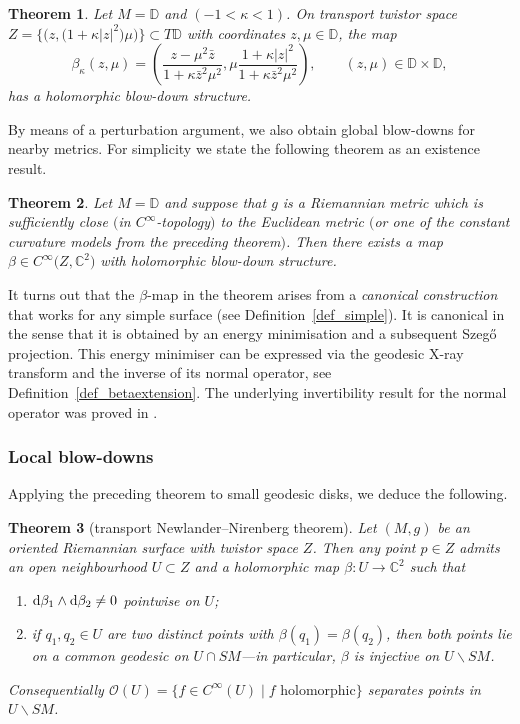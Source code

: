 \documentclass[10pt,a4paper]{amsart}
\numberwithin{equation}{section}
\newtheorem{Theorem}{Theorem}[section]
\theoremstyle{definition}
\newcommand{\C}{\mathbb{C}} %
\newcommand{\DD}{\mathbb{D}} %
\newcommand{\1}{{\bf 1}}
\begin{document}
\begin{Theorem}\label{thm_constantcurvature}
Let $M=\DD$ and  $(-1<\kappa<1)$. On transport twistor space $Z=\big\{\bigl(z,\bigl(1+\kappa|z|^2\bigr)\mu\bigr)\big\}\subset T\DD$ with coordinates $z,\mu\in \DD$, the map
\[
			\beta_{\kappa}(z,\mu) = \left(\frac{z-\mu^2\bar z}{1+\kappa \bar z^2 \mu^2},\mu \frac{1+\kappa |z|^2}{1+\kappa \bar z^2 \mu^2}\right),\qquad (z,\mu)\in \DD\times \DD,
	\]
has a {\it holomorphic blow-down structure}.
\end{Theorem}


By means of a perturbation argument, we also obtain global blow-downs for nearby metrics. For simplicity we state the following theorem as an existence result.


\begin{Theorem}\label{thm_globalbeta}
Let $M=\DD$ and suppose that $g$ is a Riemannian metric which is sufficiently close $($in $C^\infty$-topology$)$ to the Euclidean metric $($or one of the constant curvature models from the preceding theorem$)$. Then there exists a map $\beta\in C^\infty\bigl(Z,\C^2\bigr)$ with holomorphic blow-down structure.
\end{Theorem}



It turns out that the $\beta$-map in the theorem arises from a {\it canonical construction} that works for any simple surface (see Definition~\ref{def_simple}). It is canonical in the sense that it is obtained by an energy minimisation and a subsequent Szeg\H{o} projection. This energy minimiser can be expressed via the geodesic X-ray transform and the inverse of its normal operator, see Definition~\ref{def_betaextension}. The underlying invertibility result for the normal operator was proved in \cite{MNP19a}.

\subsubsection{Local blow-downs} Applying the preceding theorem to small geodesic disks, we deduce the following.


\begin{Theorem}[transport Newlander--Nirenberg theorem]\label{TNNT} Let $(M,g)$ be an oriented Riemannian surface with twistor space $Z$. Then any point $p \in Z$ admits an open neighbourhood $U\subset Z$ and a holomorphic map $\beta\colon U\rightarrow \C^2$ such that
\begin{enumerate}[label=\rm(\roman*)]\itemsep=0pt
	\item \label{thmtnnt1}${\rm d}\beta_1\wedge {\rm d}\beta_2 \neq 0$ pointwise on $U$;
	\item\label{thmtnnt2} if $q_1,q_2\in U$ are two distinct points with $\beta(q_1)=\beta(q_2)$, then both points lie on a common geodesic on $U\cap SM$---in particular, $\beta$ is injective on $U\backslash SM$.
\end{enumerate}
Consequentially $\mathcal O(U)=\{f\in C^\infty(U)\mid f \text{ holomorphic} \}$ separates points in $U\backslash SM$.
\end{Theorem}
\end{document}
